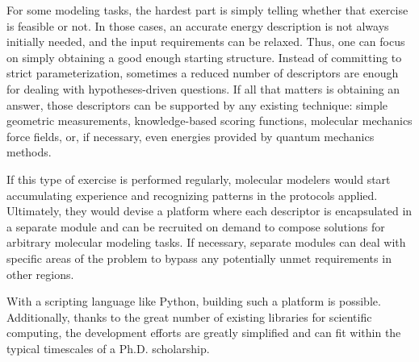 For some modeling tasks, the hardest part is simply telling whether that exercise is feasible or not. In those cases, an accurate energy description is not always initially needed, and the input requirements can be relaxed. Thus, one can focus on simply obtaining a good enough starting structure. Instead of committing to strict parameterization, sometimes a reduced number of descriptors are enough for dealing with hypotheses-driven questions. If all that matters is obtaining an answer, those descriptors can be supported by any existing technique: simple geometric measurements, knowledge-based scoring functions, molecular mechanics force fields, or, if necessary, even energies provided by quantum mechanics methods.

If this type of exercise is performed regularly, molecular modelers would start accumulating experience and recognizing patterns in the protocols applied. Ultimately, they would devise a platform where each descriptor is encapsulated in a separate module and can be recruited on demand to compose solutions for arbitrary molecular modeling tasks. If necessary, separate modules can deal with specific areas of the problem to bypass any potentially unmet requirements in other regions.

With a scripting language like Python, building such a platform is possible. Additionally, thanks to the great number of existing libraries for scientific computing, the development efforts are greatly simplified and can fit within the typical timescales of a Ph.D. scholarship.